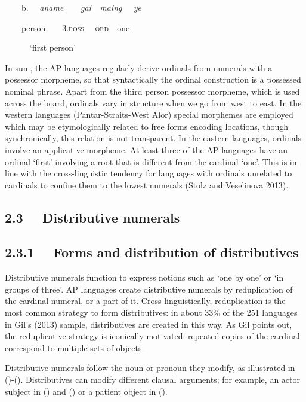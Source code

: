 \ \ \ \ b. \ \ \textit{aname\ \ \ \ gai\ \ maing \ \ ye}

\ \ \ \ person\ \ \ \ 3\textsc{.poss \ \ ord\ \ }one

\ \ \ \ \ \ {\textquoteleft}first person{\textquoteright}

In sum, the AP languages regularly derive ordinals from numerals with a possessor morpheme, so that syntactically the ordinal construction is a possessed nominal phrase. Apart from the third person possessor morpheme, which is used across the board, ordinals vary in structure when we go from west to east. In the western languages (Pantar-Straits-West Alor) special morphemes are employed which may be etymologically related to free forms encoding locations, though synchronically, this relation is not transparent. In the eastern languages, ordinals involve an applicative morpheme. At least three of the AP languages have an ordinal {\textquoteleft}first{\textquoteright} involving a root that is different from the cardinal {\textquoteleft}one{\textquoteright}. This is in line with the cross-linguistic tendency for languages with ordinals unrelated to cardinals to confine them to the lowest numerals (Stolz and Veselinova 2013).

\subsection[2.3 \ \ Distributive numerals]{\textup{2.3 \ \ Distributive numerals}}
\hypertarget{RefHeading105236871885726}{}\subsection[2.3.1 \ \ Forms and distribution of distributives ]{\textmd{2.3.1 \ \ Forms and distribution of distributives}\textmd{ }}
\hypertarget{RefHeading105238871885726}{}Distributive numerals function to express notions such as {\textquoteleft}one by one{\textquoteright} or {\textquoteleft}in groups of three{\textquoteright}. AP languages create distributive numerals by reduplication of the cardinal numeral, or a part of it. Cross-linguistically, reduplication is the most common strategy to form distributives: in about 33\% of the 251 languages in Gil{\textquoteright}s (2013) sample, distributives are created in this way. As Gil points out, the reduplicative strategy is iconically motivated: repeated copies of the cardinal correspond to multiple sets of objects.

Distributive numerals follow the noun or pronoun they modify, as illustrated in ()-(). Distributives can modify different clausal arguments; for example, an actor subject in () and () or a patient object in ().

